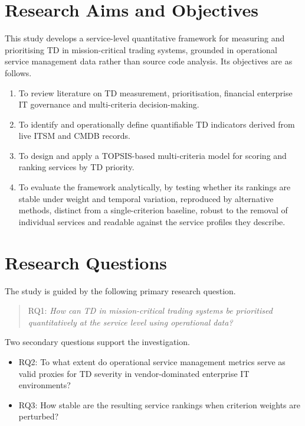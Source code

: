 \documentclass[
  12pt,
  letterpaper,
  12pt,
  oneside,
  english,
  onehalfspacing,
  headsepline]{MastersDoctoralThesis}
\providecommand{\tightlist}{%
  \setlength{\itemsep}{0pt}\setlength{\parskip}{0pt}}
\begin{document}
\section{Research Aims and
Objectives}\label{research-aims-and-objectives}

This study develops a service-level quantitative framework for measuring
and prioritising TD in mission-critical trading systems, grounded in
operational service management data rather than source code analysis.
Its objectives are as follows.

\begin{enumerate}
\def\labelenumi{\arabic{enumi}.}
\tightlist
\item
  To review literature on TD measurement, prioritisation, financial
  enterprise IT governance and multi-criteria decision-making.
\item
  To identify and operationally define quantifiable TD indicators
  derived from live ITSM and CMDB records.
\item
  To design and apply a TOPSIS-based multi-criteria model for scoring
  and ranking services by TD priority.
\item
  To evaluate the framework analytically, by testing whether its
  rankings are stable under weight and temporal variation, reproduced by
  alternative methods, distinct from a single-criterion baseline, robust
  to the removal of individual services and readable against the service
  profiles they describe.
\end{enumerate}

\section{Research Questions}\label{research-questions}

The study is guided by the following primary research question.

\begin{quote}
RQ1: \emph{How can TD in mission-critical trading systems be prioritised
quantitatively at the service level using operational data?}
\end{quote}

Two secondary questions support the investigation.

\begin{itemize}
\tightlist
\item
  RQ2: To what extent do operational service management metrics serve as
  valid proxies for TD severity in vendor-dominated enterprise IT
  environments?
\item
  RQ3: How stable are the resulting service rankings when criterion
  weights are perturbed?
\end{itemize}
\end{document}
